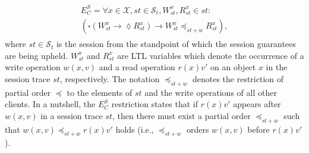 \documentclass[journal, compsoc]{IEEEtran}
\begin{document}
	\begin{align}\label{eqn:RYW}
	\begin{split}
	E^S_C =  \forall x \in \mathcal{X}, \mathit{st} \in  \mathcal{S}_t, W_\mathit{st}^x, R_\mathit{st}^x \in \mathit{st}:
	\\ \left( \square \left( W_\mathit{st}^x \rightarrow \lozenge R_\mathit{st}^x \right)
	\rightarrow  W_\mathit{st}^x  \preccurlyeq_{\mathit{st}+w} R_\mathit{st}^x \right),
	\end{split}
	\end{align} where $\mathit{st}\in \mathcal{S}_t$ is the session from the standpoint of which the session guarantees are being upheld.
	$W_\mathit{st}^x$ and $R_\mathit{st}^x$ are LTL variables which denote the occurrence of a write operation $w(x,v)$ and a read operation $r(x){v'}$ on an object $x$ in the session trace $\mathit{st}$, respectively.
	The notation $\preccurlyeq_{\mathit{st}+w}$ denotes the restriction of partial order $\preccurlyeq$ to the elements of $\mathit{st}$ and the write operations of all other clients. %
	In a nutshell, the $E^S_C$ restriction states that if $r(x){v'}$ %
	appears after $w(x,v)$ in a session trace $\mathit{st}$, %
	then there must exist a partial order $\preccurlyeq_{\mathit{st}+w}$ such that $w(x,v) \preccurlyeq_{\mathit{st}+w} r(x){v'}$ holds (i.e., $\preccurlyeq_{\mathit{st}+w}$ orders $w(x,v)$ before $r(x){v'}$).
	
\end{document}
